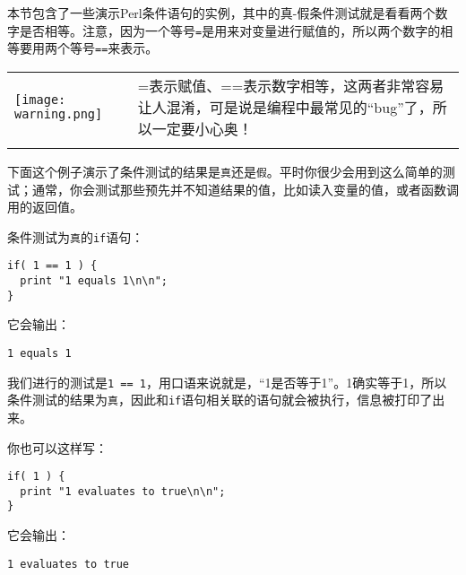 本节包含了一些演示Perl条件语句的实例，其中的真-假条件测试就是看看两个数字是否相等。注意，因为一个等号\verb|=|是用来对变量进行赋值的，所以两个数字的相等要用两个等号\verb|==|来表示。

\vspace{-5pt}
\begin{table}[h]
  \begin{center}
    \begin{tabu} to 0.85\linewidth {|X[1,r,m]X[15,l,m]|}
      \tabucline{-}
      \texttt{[image: warning.png]} & =表示赋值、==表示数字相等，这两者非常容易让人混淆，可是说是编程中最常见的“bug”了，所以一定要小心奥！\\
      \tabucline{-}
    \end{tabu}
  \end{center}
\end{table}
\vspace{-20pt}

下面这个例子演示了条件测试的结果是\verb|真|还是\verb|假|。平时你很少会用到这么简单的测试；通常，你会测试那些预先并不知道结果的值，比如读入变量的值，或者函数调用的返回值。

条件测试为\verb|真|的\verb|if|语句：

\begin{lstlisting}
if( 1 == 1 ) {
  print "1 equals 1\n\n";
}
\end{lstlisting}

它会输出：

\begin{lstlisting}
1 equals 1
\end{lstlisting}

我们进行的测试是\verb|1 == 1|，用口语来说就是，“1是否等于1”。1确实等于1，所以条件测试的结果为\verb|真|，因此和\verb|if|语句相关联的语句就会被执行，信息被打印了出来。

你也可以这样写：

\begin{lstlisting}
if( 1 ) {
  print "1 evaluates to true\n\n";
}
\end{lstlisting}

它会输出：

\begin{lstlisting}
1 evaluates to true
\end{lstlisting}

